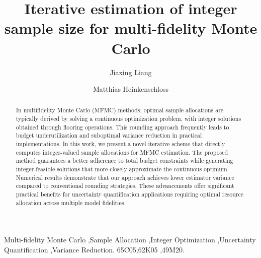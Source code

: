 \documentclass[final,3p,times,11pt]{elsarticle}
\begin{document}
\begin{frontmatter}
\title{Iterative estimation of integer sample size for multi-fidelity Monte Carlo}


\author[RiceCMOR]{Jiaxing Liang}
\address[RiceCMOR]{Department of Computational Applied Mathematics \& Operations Research, Rice University.}
\author[RiceCMOR]{Matthias Heinkenschloss}
\address[RiceCMOR]{Department of Computational Applied Mathematics \& Operations Research and The Ken Kennedy Institute, Rice  University.}
\begin{abstract}
In multifidelity Monte Carlo (MFMC) methods, optimal sample allocations are typically derived by solving a continuous optimization problem, with integer solutions obtained through flooring operations. This rounding approach frequently leads to budget underutilization and suboptimal variance reduction in practical implementations. In this work, we present a novel iterative scheme that directly computes integer-valued sample allocations for MFMC estimation. The proposed method guarantees a better adherence to total budget constraints while generating integer-feasible solutions that more closely approximate the continuous optimum. Numerical results demonstrate that our approach achieves lower estimator variance compared to conventional rounding strategies. These advancements offer significant practical benefits for uncertainty quantification applications requiring optimal resource allocation across multiple model fidelities.
\end{abstract}





\begin{keyword}
Multi-fidelity Monte Carlo \sep Sample Allocation \sep Integer Optimization  \sep Uncertainty Quantification \sep Variance Reduction.
%
\MSC[2020] 65C05\sep 62K05 \sep 49M20.
\end{keyword}
\end{frontmatter}

 
 


 
 
 



% 

% 
\end{document}
